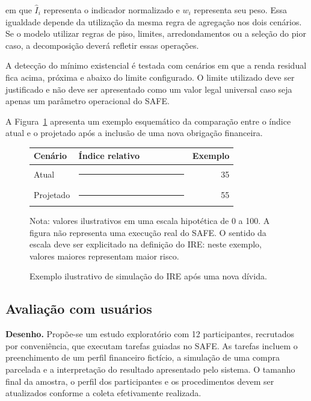 \documentclass[portuguese]{sbc2025}%
\begin{document}
em que $\hat{I}_i$ representa o indicador normalizado e $w_i$
representa seu peso. Essa igualdade depende da utilização da mesma
regra de agregação nos dois cenários. Se o modelo utilizar regras de
piso, limites, arredondamentos ou a seleção do pior caso, a
decomposição deverá refletir essas operações.

A detecção do mínimo existencial é testada com cenários em que a renda
residual fica acima, próxima e abaixo do limite configurado. O limite
utilizado deve ser justificado e não deve ser apresentado como um
valor legal universal caso seja apenas um parâmetro operacional do SAFE.

A Figura~\ref{fig:sim} apresenta um exemplo esquemático da comparação
entre o índice atual e o projetado após a inclusão de uma nova
obrigação financeira.

\begin{figure}[htbp]
\centering
\small
\caption{Exemplo ilustrativo de simulação do IRE após uma nova dívida.}
\label{fig:sim}
\begin{tabular}{@{}p{0.22\linewidth}p{0.58\linewidth}r@{}}
\toprule
\textbf{Cenário} & \textbf{Índice relativo} & \textbf{Exemplo} \\
\midrule
Atual     & \rule{28mm}{6pt} & 35 \\
Projetado & \rule{44mm}{6pt} & 55 \\
\bottomrule
\end{tabular}

\vspace{2mm}
\parbox{0.92\linewidth}{\footnotesize
Nota: valores ilustrativos em uma escala hipotética de 0 a 100.
A figura não representa uma execução real do SAFE. O sentido da escala
deve ser explicitado na definição do IRE: neste exemplo, valores maiores
representam maior risco.}
\end{figure}

\subsection{Avaliação com usuários}
\label{sec:aval-usuarios}

\textbf{Desenho.}
Propõe-se um estudo exploratório com 12 participantes, recrutados por
conveniência, que executam tarefas guiadas no SAFE. As tarefas incluem
o preenchimento de um perfil financeiro fictício, a simulação de uma
compra parcelada e a interpretação do resultado apresentado pelo
sistema. O tamanho final da amostra, o perfil dos participantes e os
procedimentos devem ser atualizados conforme a coleta efetivamente
realizada.
\end{document}
